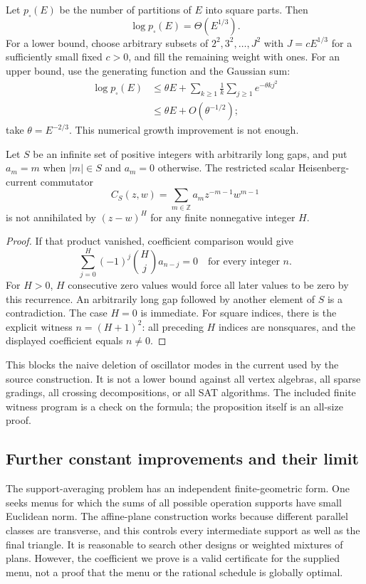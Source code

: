 Let $p_\square(E)$ be the number of partitions of $E$ into square parts.
Then
\[
 \log p_\square(E)=\Theta(E^{1/3}).
\]
For a lower bound, choose arbitrary subsets of
$2^2,3^2,\ldots,J^2$ with $J=cE^{1/3}$ for a sufficiently small fixed
$c>0$, and fill the remaining weight with ones. For an upper bound, use
the generating function and the Gaussian sum:
\begin{align*}
 \log p_\square(E)
 &\le\theta E+\sum_{k\ge1}\frac1k\sum_{j\ge1}e^{-\theta k j^2}\\
 &\le\theta E+O(\theta^{-1/2});
\end{align*}
take $\theta=E^{-2/3}$. This numerical growth improvement is not enough.

\begin{proposition}
Let $S$ be an infinite set of positive integers with arbitrarily long gaps,
and put $a_m=m$ when $|m|\in S$ and $a_m=0$ otherwise. The restricted
scalar Heisenberg-current commutator
\[
 C_S(z,w)=\sum_{m\in\mathbb Z}a_m z^{-m-1}w^{m-1}
\]
is not annihilated by $(z-w)^H$ for any finite nonnegative integer $H$.
\end{proposition}
\begin{proof}
If that product vanished, coefficient comparison would give
\[
 \sum_{j=0}^H(-1)^j\binom Hj a_{n-j}=0
 \quad\text{for every integer }n.
\]
For $H>0$, $H$ consecutive zero values would force all later values to be
zero by this recurrence. An arbitrarily long gap followed by another
element of $S$ is a contradiction. The case $H=0$ is immediate.
For square indices, there is the explicit witness
$n=(H+1)^2$: all preceding $H$ indices are nonsquares, and the displayed
coefficient equals $n\ne0$.
\end{proof}
This blocks the naive deletion of oscillator modes in the current used
by the source construction. It is not a lower bound against all vertex
algebras, all sparse gradings, all crossing decompositions, or all SAT
algorithms. The included finite witness program is a check on the formula;
the proposition itself is an all-size proof.

\subsection{Further constant improvements and their limit}
The support-averaging problem has an independent finite-geometric form.
One seeks menus for which the sums of all possible operation supports
have small Euclidean norm. The affine-plane construction works because
different parallel classes are transverse, and this controls every
intermediate support as well as the final triangle. It is reasonable to
search other designs or weighted mixtures of plans. However, the coefficient
we prove is a valid certificate for the supplied menu, not a proof that
the menu or the rational schedule is globally optimal.

